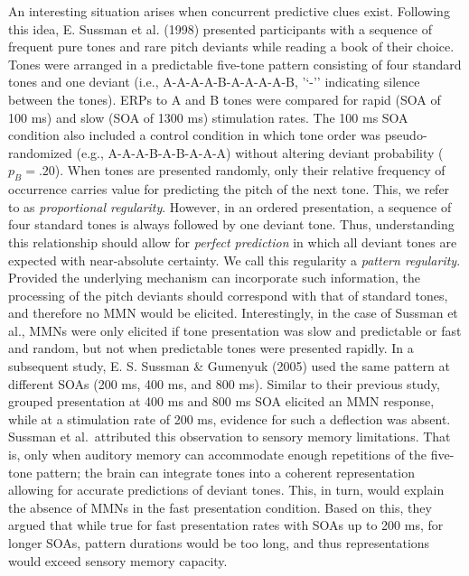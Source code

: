 \documentclass[twoside, man, a4paper,12pt, nofontenc]{apa7}
\begin{document}
An interesting situation arises when concurrent predictive clues exist.
Following this idea, E. Sussman et al. (1998) presented participants
with a sequence of frequent pure tones and rare pitch deviants while
reading a book of their choice. Tones were arranged in a predictable
five-tone pattern consisting of four standard tones and one deviant
(i.e., A-A-A-A-B-A-A-A-A-B, '\enquote*{-}' indicating silence between
the tones). ERPs to A and B tones were compared for rapid (SOA of 100
ms) and slow (SOA of 1300 ms) stimulation rates. The 100 ms SOA
condition also included a control condition in which tone order was
pseudo-randomized (e.g., A-A-A-B-A-B-A-A-A) without altering deviant
probability (\(p_B = .20\)). When tones are presented randomly, only
their relative frequency of occurrence carries value for predicting the
pitch of the next tone. This, we refer to as \emph{proportional
regularity}. However, in an ordered presentation, a sequence of four
standard tones is always followed by one deviant tone. Thus,
understanding this relationship should allow for \emph{perfect
prediction} in which all deviant tones are expected with near-absolute
certainty. We call this regularity a \emph{pattern regularity}. Provided
the underlying mechanism can incorporate such information, the
processing of the pitch deviants should correspond with that of standard
tones, and therefore no MMN would be elicited. Interestingly, in the
case of Sussman et al., MMNs were only elicited if tone presentation was
slow and predictable or fast and random, but not when predictable tones
were presented rapidly. In a subsequent study, E. S. Sussman \& Gumenyuk
(2005) used the same pattern at different SOAs (200 ms, 400 ms, and 800
ms). Similar to their previous study, grouped presentation at 400 ms and
800 ms SOA elicited an MMN response, while at a stimulation rate of 200
ms, evidence for such a deflection was absent. Sussman et al.~attributed
this observation to sensory memory limitations. That is, only when
auditory memory can accommodate enough repetitions of the five-tone
pattern; the brain can integrate tones into a coherent representation
allowing for accurate predictions of deviant tones. This, in turn, would
explain the absence of MMNs in the fast presentation condition. Based on
this, they argued that while true for fast presentation rates with SOAs
up to 200 ms, for longer SOAs, pattern durations would be too long, and
thus representations would exceed sensory memory capacity.
\end{document}
